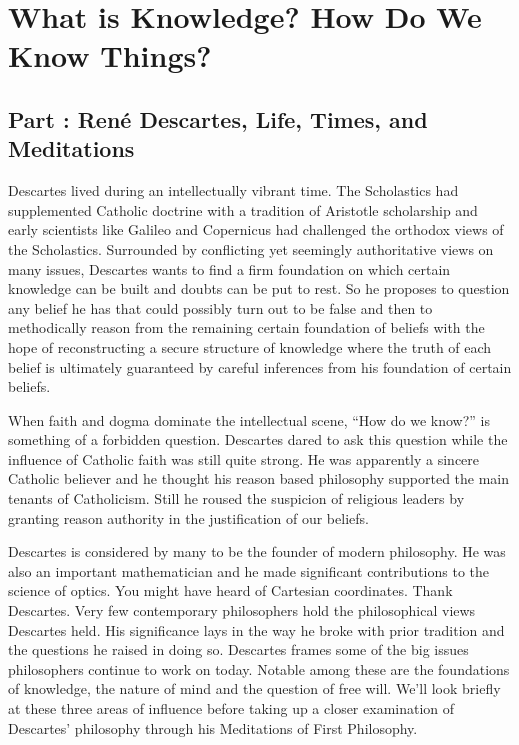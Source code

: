 \part{What is Knowledge? How Do We Know Things?}
\label{ch.modsix}

\chapter{Part \thechapcount: Ren\'e Descartes, Life, Times, and Meditations}
Descartes lived during an intellectually vibrant time. The Scholastics had supplemented Catholic doctrine with a tradition of Aristotle scholarship and early scientists like Galileo and Copernicus had challenged the orthodox views of the Scholastics. Surrounded by conflicting yet seemingly authoritative views on many issues, Descartes wants to find a firm foundation on which certain knowledge can be built and doubts can be put to rest. So he proposes to question any belief he has that could possibly turn out to be false and then to methodically reason from the remaining certain foundation of beliefs with the hope of reconstructing a secure structure of knowledge where the truth of each belief is ultimately guaranteed by careful inferences from his foundation of certain beliefs.

When faith and dogma dominate the intellectual scene, “How do we know?” is something of a forbidden question. Descartes dared to ask this question while the influence of Catholic faith was still quite strong. He was apparently a sincere Catholic believer and he thought his reason based philosophy supported the main tenants of Catholicism. Still he roused the suspicion of religious leaders by granting reason authority in the justification of our beliefs.

Descartes is considered by many to be the founder of modern philosophy. He was also an important mathematician and he made significant contributions to the science of optics. You might have heard of Cartesian coordinates. Thank Descartes. Very few contemporary philosophers hold the philosophical views Descartes held. His significance lays in the way he broke with prior tradition and the questions he raised in doing so. Descartes frames some of the big issues philosophers continue to work on today. Notable among these are the foundations of knowledge, the nature of mind and the question of free will. We’ll look briefly at these three areas of influence before taking up a closer examination of Descartes’ philosophy through his Meditations of First Philosophy.\autocite{Descartes1}

